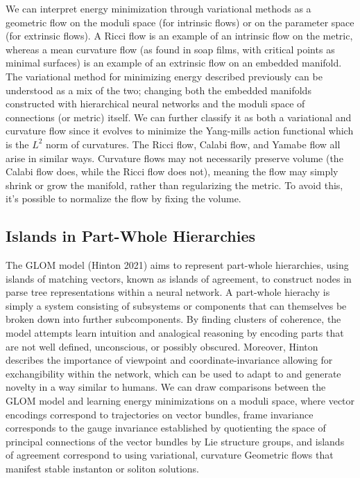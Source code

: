 \documentclass{article}
\begin{document}
    We can interpret energy minimization through variational methods as a geometric flow on the moduli space (for intrinsic flows) or on the parameter space (for extrinsic flows). A Ricci flow is an example of an intrinsic flow on the metric, whereas a mean curvature flow (as found in soap films, with critical points as minimal surfaces) is an example of an extrinsic flow on an embedded manifold. The variational method for minimizing energy described previously can be understood as a mix of the two; changing both the embedded manifolds constructed with hierarchical neural networks and the moduli space of connections (or metric) itself. We can further classify it as both a variational and curvature flow since it evolves to minimize the Yang-mills action functional which is the $L^2$ norm of curvatures. The Ricci flow, Calabi flow, and Yamabe flow all arise in similar ways. Curvature flows may not necessarily preserve volume (the Calabi flow does, while the Ricci flow does not), meaning the flow may simply shrink or grow the manifold, rather than regularizing the metric. To avoid this, it's possible to normalize the flow by fixing the volume.

    \subsection{Islands in Part-Whole Hierarchies}
    The GLOM model (Hinton 2021) aims to represent part-whole hierarchies, using islands of matching vectors, known as islands of agreement, to construct nodes in parse tree representations within a neural network. A part-whole hierachy is simply a system consisting of subsystems or components that can themselves be broken down into further subcomponents. By finding clusters of coherence, the model attempts learn intuition and analogical reasoning by encoding parts that are not well defined, unconscious, or possibly obscured. Moreover, Hinton describes the importance of  viewpoint and coordinate-invariance allowing for exchangibility within the network, which can be used to adapt to and generate novelty in a way similar to humans. We can draw comparisons between the GLOM model and learning energy minimizations on a moduli space, where vector encodings correspond to trajectories on vector bundles, frame invariance corresponds to the gauge invariance established by quotienting the space of principal connections of the vector bundles by Lie structure groups, and islands of agreement correspond to using variational, curvature Geometric flows that manifest stable instanton or soliton solutions. 
    
\end{document}
